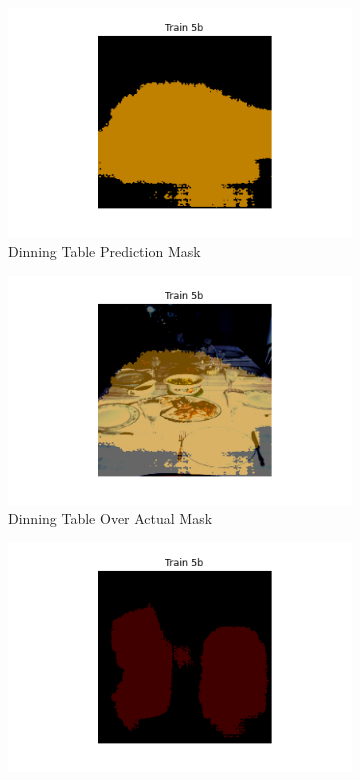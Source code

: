 \documentclass{article}
\begin{document}
\begin{figure}[h]
\begin{subfigure}[b]{0.45\textwidth}
    \includegraphics[width=\textwidth]{include/best model/dinningtable1_pred.png}
    \caption{Dinning Table Prediction Mask}
\end{subfigure}
\hfill %
\begin{subfigure}[b]{0.45\textwidth}
    \centering
    \includegraphics[width=\textwidth]{include/best model/diningtable1_over_actual.png} %
    \caption{Dinning Table Over Actual Mask}
\end{subfigure}
\begin{subfigure}[b]{0.45\textwidth}
  \centering
  \includegraphics[width=\textwidth]{include/best model/cat1_pred.png}

\end{subfigure}
\end{figure}
\end{document}
